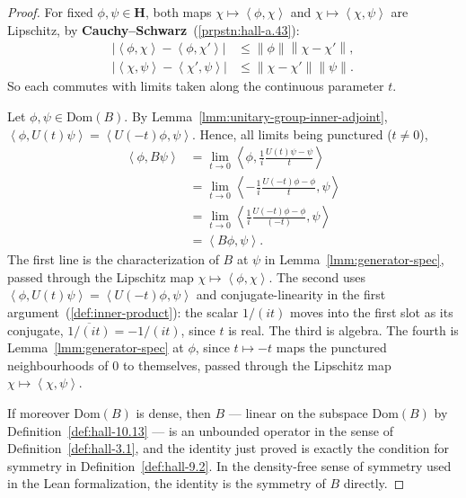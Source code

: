 \begin{proof}
    \leanok
For fixed $\phi, \psi \in \mathbf{H}$, both maps $\chi \mapsto \left< \phi, \chi \right>$ and $\chi \mapsto \left< \chi, \psi \right>$ are Lipschitz, by \textbf{Cauchy–Schwarz}~(\ref{prpstn:hall-a.43}):
\begin{align}
    \lvert \left< \phi, \chi \right> - \left< \phi, \chi' \right> \rvert &\le \left\| \phi \right\| \left\| \chi - \chi' \right\|, \\
    \lvert \left< \chi, \psi \right> - \left< \chi', \psi \right> \rvert &\le \left\| \chi - \chi' \right\| \left\| \psi \right\|.
\end{align}
So each commutes with limits taken along the continuous parameter $t$.

Let $\phi, \psi \in \text{Dom}(B)$. By Lemma~\ref{lmm:unitary-group-inner-adjoint}, $\left< \phi, U(t)\psi \right> = \left< U(-t)\phi, \psi \right>$. Hence, all limits being punctured ($t \ne 0$),
\begin{align}
    \left< \phi, B\psi \right> &= \lim\limits_{t \rightarrow 0} \left< \phi, \frac{1}{i}\frac{U(t)\psi - \psi}{t} \right> \\
        &= \lim\limits_{t \rightarrow 0} \left< -\frac{1}{i}\frac{U(-t)\phi - \phi}{t}, \psi \right> \\
        &= \lim\limits_{t \rightarrow 0} \left< \frac{1}{i}\frac{U(-t)\phi - \phi}{(-t)}, \psi \right> \\
        &= \left< B\phi, \psi \right>.
\end{align}
The first line is the characterization of $B$ at $\psi$ in Lemma~\ref{lmm:generator-spec}, passed through the Lipschitz map $\chi \mapsto \left< \phi, \chi \right>$. The second uses $\left< \phi, U(t)\psi \right> = \left< U(-t)\phi, \psi \right>$ and conjugate-linearity in the first argument~(\ref{def:inner-product}): the scalar $1/(it)$ moves into the first slot as its conjugate, $\overline{1/(it)} = -1/(it)$, since $t$ is real. The third is algebra. The fourth is Lemma~\ref{lmm:generator-spec} at $\phi$, since $t \mapsto -t$ maps the punctured neighbourhoods of $0$ to themselves, passed through the Lipschitz map $\chi \mapsto \left< \chi, \psi \right>$.

If moreover $\text{Dom}(B)$ is dense, then $B$ — linear on the subspace $\text{Dom}(B)$ by Definition~\ref{def:hall-10.13} — is an unbounded operator in the sense of Definition~\ref{def:hall-3.1}, and the identity just proved is exactly the condition for symmetry in Definition~\ref{def:hall-9.2}. In the density-free sense of symmetry used in the Lean formalization, the identity is the symmetry of $B$ directly.
\end{proof}

